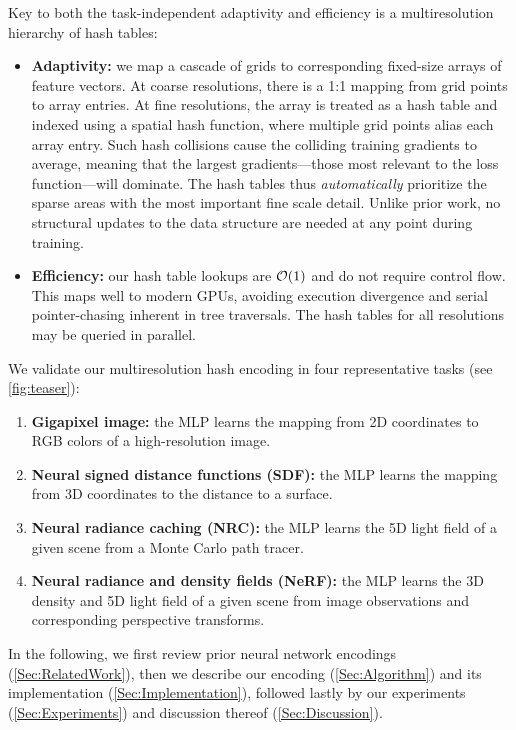 \documentclass[acmtog,authorversion]{acmart}
\begin{document}
Key to both the task-independent adaptivity and efficiency is a multiresolution hierarchy of hash tables:
\begin{itemize}[leftmargin=*]
  \item {\bf Adaptivity:} we map a cascade of grids to corresponding fixed-size arrays of feature vectors. At coarse resolutions, there is a 1:1 mapping from grid points to array entries. At fine resolutions, the array is treated as a hash table and indexed using a spatial hash function, where multiple grid points alias each array entry. Such hash collisions cause the colliding training gradients to average, meaning that the largest gradients---those most relevant to the loss function---will dominate. The hash tables thus \emph{automatically} prioritize the sparse areas with the most important fine scale detail.
  Unlike prior work, no structural updates to the data structure are needed at any point during training.
  \item {\bf Efficiency:} our hash table lookups are $\mathcal{O}(1)$ and do not require control flow. This maps well to modern GPUs, avoiding execution divergence and serial pointer-chasing inherent in tree traversals. The hash tables for all resolutions may be queried in parallel.
\end{itemize}
We validate our multiresolution hash encoding in four representative tasks (see \autoref{fig:teaser}):
\begin{enumerate}[leftmargin=*]
  \item \textbf{Gigapixel image:} the MLP learns the mapping from 2D coordinates to RGB colors of a high-resolution image.
  \item \textbf{Neural signed distance functions (SDF):} the MLP learns the mapping from 3D coordinates to the distance to a surface.
  \item \textbf{Neural radiance caching (NRC):} the MLP learns the 5D light field of a given scene from a Monte Carlo path tracer.
  \item \textbf{Neural radiance and density fields (NeRF):} the MLP learns the 3D density and 5D light field of a given scene from image observations and corresponding perspective transforms.
\end{enumerate}

In the following, we first review prior neural network encodings (\autoref{Sec:RelatedWork}), then we describe our encoding (\autoref{Sec:Algorithm}) and its implementation (\autoref{Sec:Implementation}), followed lastly by our experiments (\autoref{Sec:Experiments}) and discussion thereof (\autoref{Sec:Discussion}).
\end{document}
